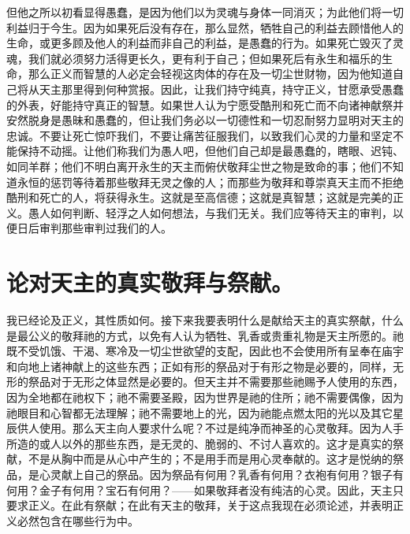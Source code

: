 但他之所以初看显得愚蠢，是因为他们以为灵魂与身体一同消灭；为此他们将一切利益归于今生。因为如果死后没有存在，那么显然，牺牲自己的利益去顾惜他人的生命，或更多顾及他人的利益而非自己的利益，是愚蠢的行为。如果死亡毁灭了灵魂，我们就必须努力活得更长久，更有利于自己；但如果死后有永生和福乐的生命，那么正义而智慧的人必定会轻视这肉体的存在及一切尘世财物，因为他知道自己将从天主那里得到何种赏报。因此，让我们持守纯真，持守正义，甘愿承受愚蠢的外表，好能持守真正的智慧。如果世人认为宁愿受酷刑和死亡而不向诸神献祭并安然脱身是愚昧和愚蠢的，但让我们务必以一切德性和一切忍耐努力显明对天主的忠诚。不要让死亡惊吓我们，不要让痛苦征服我们，以致我们心灵的力量和坚定不能保持不动摇。让他们称我们为愚人吧，但他们自己却是最愚蠢的，瞎眼、迟钝、如同羊群；他们不明白离开永生的天主而俯伏敬拜尘世之物是致命的事；他们不知道永恒的惩罚等待着那些敬拜无灵之像的人；而那些为敬拜和尊崇真天主而不拒绝酷刑和死亡的人，将获得永生。这就是至高信德；这就是真智慧；这就是完美的正义。愚人如何判断、轻浮之人如何想法，与我们无关。我们应等待天主的审判，以便日后审判那些审判过我们的人。\par


\section{论对天主的真实敬拜与祭献。}

我已经论及正义，其性质如何。接下来我要表明什么是献给天主的真实祭献，什么是最公义的敬拜祂的方式，以免有人认为牺牲、乳香或贵重礼物是天主所愿的。祂既不受饥饿、干渴、寒冷及一切尘世欲望的支配，因此也不会使用所有呈奉在庙宇和向地上诸神献上的这些东西；正如有形的祭品对于有形之物是必要的，同样，无形的祭品对于无形之体显然是必要的。但天主并不需要那些祂赐予人使用的东西，因为全地都在祂权下；祂不需要圣殿，因为世界是祂的住所；祂不需要偶像，因为祂眼目和心智都无法理解；祂不需要地上的光，因为祂能点燃太阳的光以及其它星辰供人使用。那么天主向人要求什么呢？不过是纯净而神圣的心灵敬拜。因为人手所造的或人以外的那些东西，是无灵的、脆弱的、不讨人喜欢的。这才是真实的祭献，不是从胸中而是从心中产生的；不是用手而是用心灵奉献的。这才是悦纳的祭品，是心灵献上自己的祭品。因为祭品有何用？乳香有何用？衣袍有何用？银子有何用？金子有何用？宝石有何用？——如果敬拜者没有纯洁的心灵。因此，天主只要求正义。在此有祭献；在此有天主的敬拜，关于这点我现在必须论述，并表明正义必然包含在哪些行为中。\par


